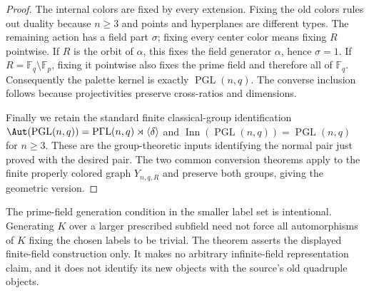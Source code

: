 \begin{proof}
The internal colors are fixed by every extension. Fixing the old
colors rules out duality because $n\ge3$ and points and hyperplanes
are different types. The remaining action has a field part $\sigma$;
fixing every center color means fixing $R$ pointwise. If $R$ is the
orbit of $\alpha$, this fixes the field generator $\alpha$, hence
$\sigma=1$. If $R=\mathbb F_q\setminus\mathbb F_p$, fixing it
pointwise also fixes the prime field and therefore all of
$\mathbb F_q$. Consequently the palette kernel is exactly
$\operatorname{PGL}(n,q)$. The converse inclusion follows because
projectivities preserve cross-ratios and dimensions.

Finally we retain the standard finite classical-group identification
$\Aut(\operatorname{PGL}(n,q))=
\operatorname{P\Gamma L}(n,q)\rtimes\langle\delta\rangle$ and
$\operatorname{Inn}(\operatorname{PGL}(n,q))=
\operatorname{PGL}(n,q)$ for $n\ge3$. These are the group-theoretic
inputs identifying the normal pair just proved with the desired pair.
The two common conversion theorems apply to the finite properly colored
graph $Y_{n,q,R}$ and preserve both groups, giving the geometric version.
\end{proof}

The prime-field generation condition in the smaller label set is
intentional. Generating $K$ over a larger prescribed subfield need not
force all automorphisms of $K$ fixing the chosen labels to be trivial.
The theorem asserts the displayed finite-field construction only. It
makes no arbitrary infinite-field representation claim, and it does
not identify its new objects with the source's old quadruple objects.
